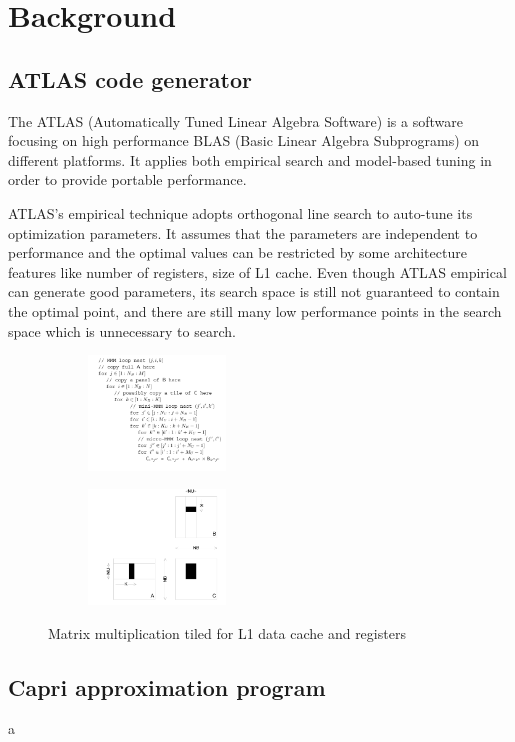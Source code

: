 \section{Background}
\label{sec:background}

  \subsection{ATLAS code generator}
  \label{sec:atlas_intro}
  The ATLAS (Automatically Tuned Linear Algebra Software) is a software focusing on high performance 
  BLAS (Basic Linear Algebra Subprograms) on different platforms. It applies both empirical search and model-based 
  tuning in order to provide portable performance. \par
  ATLAS's empirical technique adopts orthogonal line search to auto-tune its optimization parameters.
  It assumes that the parameters are independent to performance and the optimal values can be
  restricted by some architecture features like number of registers, size of L1 cache.
  Even though ATLAS empirical can generate good parameters, its search space is still not guaranteed to contain
  the optimal point, and there are still many low performance points in the search space which is unnecessary
  to search.

  \begin{figure}
  \centering
  \begin{subfigure}{1.0\linewidth}
    \includegraphics[width=0.4\textwidth]{images/ATLAS_code.png}
    \caption{}
  \end{subfigure}
  \begin{subfigure}[t]{1.0\linewidth}
    \includegraphics[width=0.4\textwidth]{images/ATLAS_pic.png}
    \caption{}
  \end{subfigure}
  \caption{Matrix multiplication tiled for L1 data cache and registers}
  \label{fig:design}
\end{figure}



  \subsection{Capri approximation program}
  \label{sec:Capri_intro}
  a
